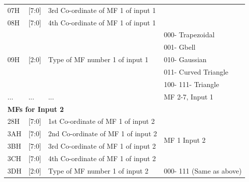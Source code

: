\begin{table}[h!]
{\begin{tabular}{@{}llll@{}}
			\multicolumn{1}{|l|}{07H} & \multicolumn{1}{l|}{{[}7:0{]}} & \multicolumn{1}{l|}{3rd Co-ordinate of MF 1 of input 1} & \multicolumn{1}{l|}{} \\ \cmidrule(r){1-2}
			\multicolumn{1}{|l|}{08H} & \multicolumn{1}{l|}{{[}7:0{]}} & \multicolumn{1}{l|}{4th Co-ordinate of MF 1 of input 1} & \multicolumn{1}{l|}{} \\ \midrule
			\multicolumn{1}{|l|}{\multirow{5}{*}{09H}} & \multicolumn{1}{l|}{\multirow{5}{*}{{[}2:0{]}}} & \multicolumn{1}{l|}{\multirow{5}{*}{Type of MF number 1 of input 1}} & \multicolumn{1}{l|}{000- Trapezoidal} \\ \cmidrule(l){4-4} 
			\multicolumn{1}{|l|}{} & \multicolumn{1}{l|}{} & \multicolumn{1}{l|}{} & \multicolumn{1}{l|}{001- Gbell} \\ \cmidrule(l){4-4} 
			\multicolumn{1}{|l|}{} & \multicolumn{1}{l|}{} & \multicolumn{1}{l|}{} & \multicolumn{1}{l|}{010- Gaussian} \\ \cmidrule(l){4-4} 
			\multicolumn{1}{|l|}{} & \multicolumn{1}{l|}{} & \multicolumn{1}{l|}{} & \multicolumn{1}{l|}{011- Curved Triangle} \\ \cmidrule(l){4-4} 
			\multicolumn{1}{|l|}{} & \multicolumn{1}{l|}{} & \multicolumn{1}{l|}{} & \multicolumn{1}{l|}{100- 111- Triangle} \\ \midrule
			\multicolumn{1}{|l|}{...} & \multicolumn{1}{l|}{...} & \multicolumn{1}{l|}{...} & \multicolumn{1}{l|}{MF 2-7, Input 1} \\ \midrule
			\multicolumn{4}{|l|}{\textbf{MFs for Input 2}} \\ \midrule
			\multicolumn{1}{|l|}{28H} & \multicolumn{1}{l|}{{[}7:0{]}} & \multicolumn{1}{l|}{1st Co-ordinate of MF 1 of input 2} & \multicolumn{1}{l|}{\multirow{4}{*}{MF 1 Input 2}} \\ \cmidrule(r){1-3}
			\multicolumn{1}{|l|}{3AH} & \multicolumn{1}{l|}{{[}7:0{]}} & \multicolumn{1}{l|}{2nd Co-ordinate of MF 1 of input 2} & \multicolumn{1}{l|}{} \\ \cmidrule(r){1-3}
			\multicolumn{1}{|l|}{3BH} & \multicolumn{1}{l|}{{[}7:0{]}} & \multicolumn{1}{l|}{3rd Co-ordinate of MF 1 of input 2} & \multicolumn{1}{l|}{} \\ \cmidrule(r){1-3}
			\multicolumn{1}{|l|}{3CH} & \multicolumn{1}{l|}{{[}7:0{]}} & \multicolumn{1}{l|}{4th Co-ordinate of MF 1 of input 2} & \multicolumn{1}{l|}{} \\ \midrule
			\multicolumn{1}{|l|}{3DH} & \multicolumn{1}{l|}{{[}2:0{]}} & \multicolumn{1}{l|}{Type of MF number 1 of input 2} & \multicolumn{1}{l|}{000- 111 (Same as above)} \\ \midrule

\end{tabular}}
\end{table}

